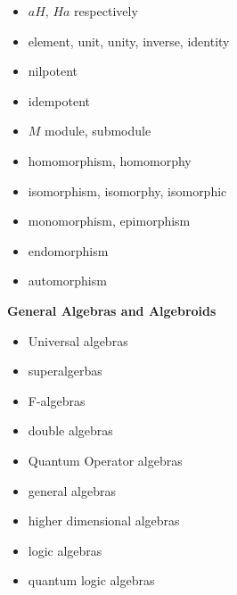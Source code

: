 \documentclass[12pt]{article}
\begin{document}
\begin{itemize}
\item $aH, \,Ha$  respectively
\item element, unit, unity, inverse, identity
\item nilpotent
\item idempotent
\item $M$ module, submodule
\item homomorphism, homomorphy
\item isomorphism, isomorphy, isomorphic
\item monomorphism, epimorphism
\item endomorphism
\item automorphism
\end{itemize}

\textbf{General Algebras and Algebroids}

\begin{itemize}
\item Universal algebras
\item superalgerbas
\item F-algebras
\item double algebras
\item Quantum Operator algebras
\item general algebras
\item higher dimensional algebras
\item logic algebras
\item quantum logic algebras
\end{itemize}
\end{document}
